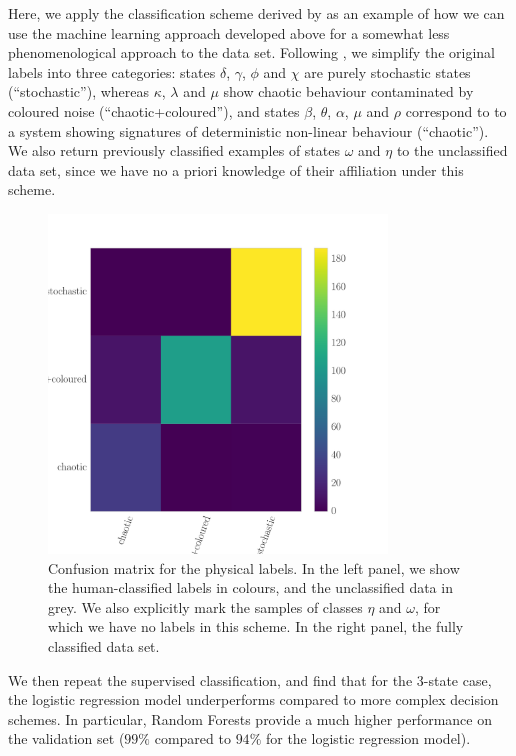 \documentclass[12pt]{emulateapj}
\begin{document}
Here, we apply the classification scheme derived by \citet{harikrishnan2011} as an example of how we can use the machine learning approach developed above 
for a somewhat less phenomenological approach to the data set. 
Following \citet{harikrishnan2011}, we simplify the original labels into three categories: states $\delta$, $\gamma$, $\phi$ and $\chi$ are purely stochastic states
(``stochastic''), whereas $\kappa$, $\lambda$ and $\mu$ show chaotic behaviour contaminated by coloured noise (``chaotic+coloured''), and states $\beta$, $\theta$, $\alpha$, $\mu$ and $\rho$ correspond to to a system showing signatures of deterministic non-linear behaviour (``chaotic'').
We also return previously classified examples of states $\omega$ and $\eta$ to the unclassified data set, since we have no a priori knowledge of their affiliation under this scheme.
\begin{figure}[htbp]
\begin{center}
\includegraphics[width=9cm]{grs1915_supervised_phys_cm.pdf}
\caption{Confusion matrix for the physical labels. In the left panel, we show the human-classified labels in colours, and the unclassified data in grey. We also 
explicitly mark the samples of classes $\eta$ and $\omega$, for which we have no labels in this scheme. In the right panel, the fully classified data set.} 
\label{fig:confusionmatrix_physical}
\end{center}
\end{figure}
We then repeat the supervised classification, and find that for the 3-state case, the logistic regression model underperforms compared to more complex decision schemes. In particular, Random Forests provide a much higher performance on the validation set ($99\%$ compared to $94\%$ for the logistic regression model). 
\end{document}
